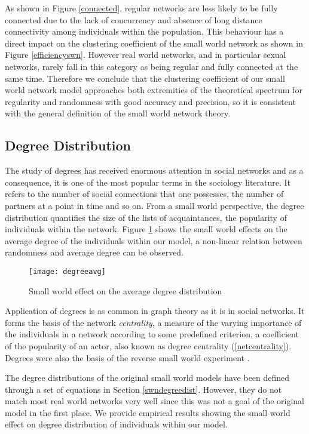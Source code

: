 As shown in Figure \ref{connected}, regular networks are less likely to be fully
connected due to the lack of concurrency and absence of long distance connectivity among
individuals within the population. This behaviour has a direct impact on the clustering
coefficient of the small world network as shown in Figure \ref{efficiencyswn}. However
real world networks, and in particular sexual networks, rarely fall in this category as
being regular and fully connected at the same time. Therefore we conclude that the
clustering coefficient of our small world network model approaches both extremities of
the theoretical spectrum for regularity and randomness with good accuracy and precision,
so it is consistent with the general definition of the small world network theory.


\subsection{Degree Distribution}

The study of degrees has received enormous attention in social networks and as a
consequence, it is one of the most popular terms in the sociology literature. It refers
to the number of social connections that one possesses, the number of partners at a point
in time and so on. From a small world perspective, the degree distribution quantifies the
size of the lists of acquaintances, the popularity of individuals within the network.
Figure \ref{degreeavg} shows the small world effects on the average degree of the
individuals within our model, a non-linear relation between randomness and average degree
can be observed.
\begin{figure}[h]
\texttt{[image: degreeavg]}
\caption{Small world effect on the average degree distribution} \label{degreeavg}
\end{figure}

Application of degrees is as common in graph theory as it is in social networks. It forms
the basis of the network \emph{centrality}, a measure of the varying importance of the
individuals in a network according to some predefined criterion, a coefficient of the
popularity of an actor, also known as degree centrality (\ref{netcentrality}). Degrees
were also the basis of the reverse small world experiment \cite{Killworth1978}.

The degree distributions of the original small world models have been defined through a
set of equations in Section \ref{swndegreedist}. However, they do not match most real
world networks very well since this was not a goal of the original model in the first
place. We provide empirical results showing the small world effect on degree distribution
of individuals within our model.

